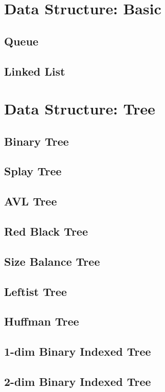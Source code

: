 \documentclass{article}
\begin{document}
\section{Data Structure: Basic}
    \subsection{Queue}

    \subsection{Linked List}

\section{Data Structure: Tree}
    \subsection{Binary Tree}

    \subsection{Splay Tree}
        
    \subsection{AVL Tree}
        
    \subsection{Red Black Tree}
    \subsection{Size Balance Tree}
    \subsection{Leftist Tree}
    \subsection{Huffman Tree}
    \subsection{1-dim Binary Indexed Tree}
    \subsection{2-dim Binary Indexed Tree}
\end{document}
